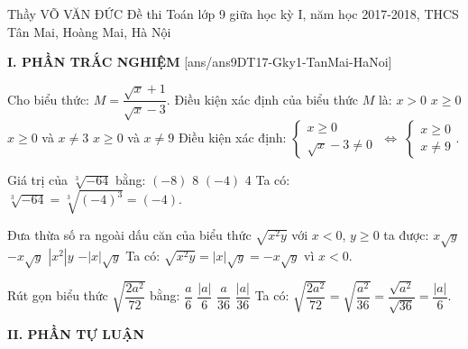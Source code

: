 \begin{name}
{Thầy VÕ VĂN ĐỨC}
{Đề thi Toán lớp 9 giữa học kỳ I, năm học 2017-2018, THCS Tân Mai, Hoàng Mai, Hà Nội}
\end{name}
\noindent\textbf{I. PHẦN TRẮC NGHIỆM}
\setcounter{ex}{0}
[ans/ans9DT17-Gky1-TanMai-HaNoi]
\begin{ex}%
	Cho biểu thức: $M=\dfrac{\sqrt{x}+1}{\sqrt{x}-3}$. Điều kiện xác định của biểu thức $M$ là:
	\choice
	{$x>0$}
	{$x\geq 0$}
	{$x\geq 0$ và $x\neq 3$}
	{\True $x\geq 0$ và $x\neq 9$}
	\loigiai
	{
	Điều kiện xác định: $\left\{\begin{matrix}
	x\geq 0\\
	\sqrt{x}-3\neq 0
	\end{matrix}\right. \; \Leftrightarrow \; \left\{\begin{matrix}
	x\geq 0\\
	x\neq 9
	\end{matrix}\right.$.
	}
\end{ex}
\begin{ex}%
	Giá trị của $\sqrt[3]{-64}$ bằng:
	\choice
	{$(-8)$}
	{8}
	{\True $(-4)$}
	{4}
	\loigiai
	{
	Ta có: $\sqrt[3]{-64}=\sqrt[3]{(-4)^3}=(-4)$.
	}
\end{ex}
\begin{ex}%
	Đưa thừa số ra ngoài dấu căn của biểu thức $\sqrt{x^2y}$ với $x<0$, $y\geq 0$ ta được:
	\choice
	{$x\sqrt{y}$}
	{\True $-x\sqrt{y}$}
	{$|x^2|y$}
	{$-|x|\sqrt{y}$}
	\loigiai
	{
	Ta có: $\sqrt{x^2y}=|x|\sqrt{y}=-x\sqrt{y}$ vì $x<0$.
	}
\end{ex}
\begin{ex}%
	Rút gọn biểu thức $\sqrt{\dfrac{2a^2}{72}}$ bằng:
	\choice
	{$\dfrac{a}{6}$}
	{\True $\dfrac{|a|}{6}$}
	{$\dfrac{a}{36}$}
	{$\dfrac{|a|}{36}$}
	\loigiai
	{
	Ta có: $\sqrt{\dfrac{2a^2}{72}}=\sqrt{\dfrac{a^2}{36}}=\dfrac{\sqrt{a^2}}{\sqrt{36}}=\dfrac{|a|}{6}$.
	}
\end{ex}
\noindent\textbf{II. PHẦN TỰ LUẬN}
\setcounter{ex}{0}
